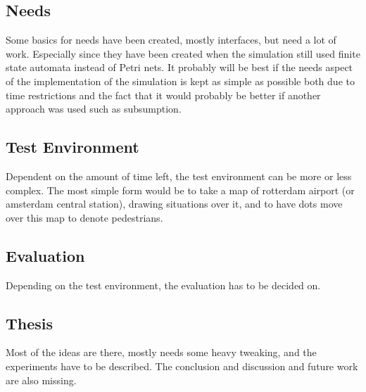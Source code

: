 \documentclass[11pt]{article}
\begin{document}
\subsection{Needs}
Some basics for needs have been created, mostly interfaces, but need a lot of work. Especially since they have been created when the simulation still used finite state automata instead of Petri nets. It probably will be best if the needs aspect of the implementation of the simulation is kept as simple as possible both due to time restrictions and the fact that it would probably be better if another approach was used such as subsumption.

\subsection{Test Environment}
Dependent on the amount of time left, the test environment can be more or less complex. The most simple form would be to take a map of rotterdam airport (or amsterdam central station), drawing situations over it, and to have dots move over this map to denote pedestrians.

\subsection{Evaluation}
Depending on the test environment, the evaluation has to be decided on.


\subsection{Thesis}
Most of the ideas are there, mostly needs some heavy tweaking, and the experiments have to be described. The conclusion and discussion and future work are also missing.
\end{document}
